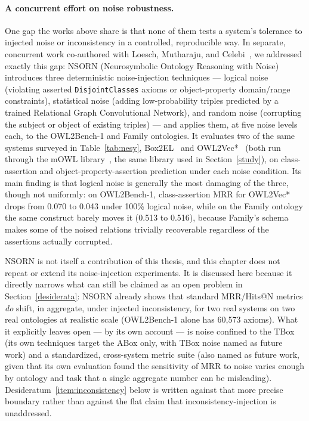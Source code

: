 \paragraph{A concurrent effort on noise robustness.} One gap the works above share is that none of them tests a system's tolerance to injected noise or inconsistency in a controlled, reproducible way. In separate, concurrent work co-authored with Loesch, Mutharaju, and Celebi~\cite{loesch2024nsorn}, we addressed exactly this gap: NSORN (Neurosymbolic Ontology Reasoning with Noise) introduces three deterministic noise-injection techniques — logical noise (violating asserted \texttt{DisjointClasses} axioms or object-property domain/range constraints), statistical noise (adding low-probability triples predicted by a trained Relational Graph Convolutional Network), and random noise (corrupting the subject or object of existing triples) — and applies them, at five noise levels each, to the OWL2Bench-1 and Family ontologies. It evaluates two of the same systems surveyed in Table~\ref{tab:nesy}, Box2EL~\cite{dualboxembeddings} and OWL2Vec*~\cite{owl2vecstar} (both run through the mOWL library~\cite{mowl}, the same library used in Section~\ref{study}), on class-assertion and object-property-assertion prediction under each noise condition. Its main finding is that logical noise is generally the most damaging of the three, though not uniformly: on OWL2Bench-1, class-assertion MRR for OWL2Vec* drops from 0.070 to 0.043 under 100\% logical noise, while on the Family ontology the same construct barely moves it (0.513 to 0.516), because Family's schema makes some of the noised relations trivially recoverable regardless of the assertions actually corrupted.

NSORN is not itself a contribution of this thesis, and this chapter does not repeat or extend its noise-injection experiments. It is discussed here because it directly narrows what can still be claimed as an open problem in Section~\ref{desiderata}: NSORN already shows that standard MRR/Hits@N metrics \emph{do} shift, in aggregate, under injected inconsistency, for two real systems on two real ontologies at realistic scale (OWL2Bench-1 alone has 60{,}573 axioms). What it explicitly leaves open — by its own account — is noise confined to the TBox (its own techniques target the ABox only, with TBox noise named as future work) and a standardized, cross-system metric suite (also named as future work, given that its own evaluation found the sensitivity of MRR to noise varies enough by ontology and task that a single aggregate number can be misleading). Desideratum~\ref{item:inconsistency} below is written against that more precise boundary rather than against the flat claim that inconsistency-injection is unaddressed.


